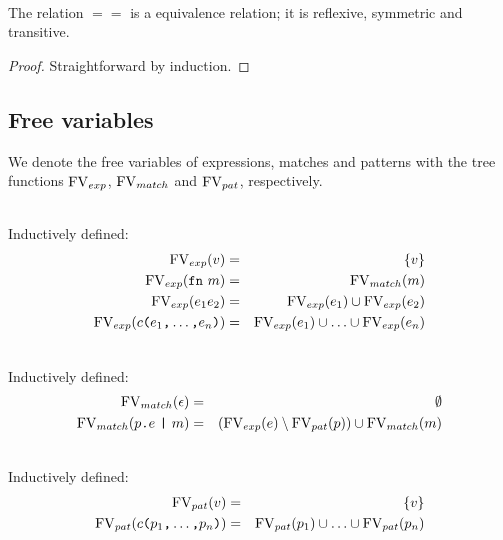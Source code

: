 \begin{lemma}\ \\
  The relation $==$ is a equivalence relation; it is reflexive, symmetric and
  transitive.

  \begin{proof}
    Straightforward by induction.
  \end{proof}
\end{lemma}

\subsection{Free variables}\label{sec:free-variables}

We denote the free variables of expressions, matches and patterns with the tree
functions $\mathrm{FV}_{exp}$, $\mathrm{FV}_{match}$ and $\mathrm{FV}_{pat}$, respectively.

\begin{definition}\ \\
  Inductively defined:
  \begin{eqnarray}
    \mathrm{FV}_{exp} (v) &=& \{v\} \\
    \mathrm{FV}_{exp} (\texttt{fn}\  m) &=& \mathrm{FV}_{match} (m) \\
    \mathrm{FV}_{exp} (e_1e_2) &=& \mathrm{FV}_{exp} (e_1) \cup \mathrm{FV}_{exp} (e_2) \\
    \mathrm{FV}_{exp} (c\texttt{(}e_1\texttt{,} \ldots \texttt{,} e_n \texttt{)}) &=& \mathrm{FV}_{exp}
    (e_1) \cup \ldots \cup \mathrm{FV}_{exp} (e_n)
  \end{eqnarray}
\end{definition}

\begin{definition}\ \\
  Inductively defined:
  \begin{eqnarray}
    \mathrm{FV}_{match} (\epsilon) &=& \emptyset \\
    \mathrm{FV}_{match} (p\texttt{.}e\ \texttt{|}\ m) &=& \left( \mathrm{FV}_{exp}(e) \setminus
      \mathrm{FV}_{pat}(p) \right) \cup \mathrm{FV}_{match} (m)
  \end{eqnarray}
\end{definition}

\begin{definition} \ \\
  Inductively defined:
  \begin{eqnarray}
    \mathrm{FV}_{pat} (v) &=& \{v\} \\
    \mathrm{FV}_{pat} (c\texttt{(}p_1\texttt{,} \ldots \texttt{,} p_n\texttt{)}) &=& \mathrm{FV}_{pat} (p_1)
    \cup \ldots \cup \mathrm{FV}_{pat} (p_n)
  \end{eqnarray}
\end{definition}

